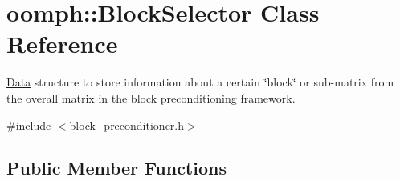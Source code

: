 \hypertarget{classoomph_1_1BlockSelector}{}\section{oomph\+:\+:Block\+Selector Class Reference}
\label{classoomph_1_1BlockSelector}


\hyperlink{classoomph_1_1Data}{Data} structure to store information about a certain \char`\"{}block\char`\"{} or sub-\/matrix from the overall matrix in the block preconditioning framework.  




{\ttfamily \#include $<$block\+\_\+preconditioner.\+h$>$}

\subsection*{Public Member Functions}
